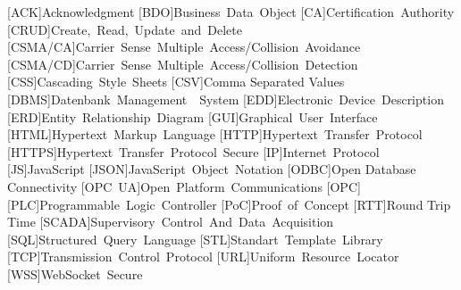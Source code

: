 \begin{multicols}{2}
  \begin{acronym}
    [ACK]{Acknowledgment}
    [BDO]{Business Data Object}
    [CA]{Certification Authority}
    [CRUD]{Create, Read, Update and Delete}
    [CSMA/CA]{Carrier Sense Multiple Access/Collision Avoidance}
    [CSMA/CD]{Carrier Sense Multiple Access/Collision Detection}
    [CSS]{Cascading Style Sheets}
    [CSV]{Comma Separated Values}
    [DBMS]{Datenbank Management  System}
    [EDD]{Electronic Device Description}
    [ERD]{Entity Relationship Diagram}
    [GUI]{Graphical User Interface}
    [HTML]{Hypertext Markup Language}
    [HTTP]{Hypertext Transfer Protocol}
    [HTTPS]{Hypertext Transfer Protocol Secure}
    [IP]{Internet Protocol}
    [JS]{JavaScript}
    [JSON]{JavaScript Object Notation}
    [ODBC]{Open Database Connectivity}
    [OPC UA]{Open Platform Communications}
    [OPC]{}
    [PLC]{Programmable Logic Controller}
    [PoC]{Proof of Concept}
    [RTT]{Round Trip Time}
    [SCADA]{Supervisory Control And Data Acquisition}
    [SQL]{Structured Query Language}
    [STL]{Standart Template Library}
    [TCP]{Transmission Control Protocol}
    [URL]{Uniform Resource Locator}
    [WSS]{WebSocket Secure}
  \end{acronym}
\end{multicols}
